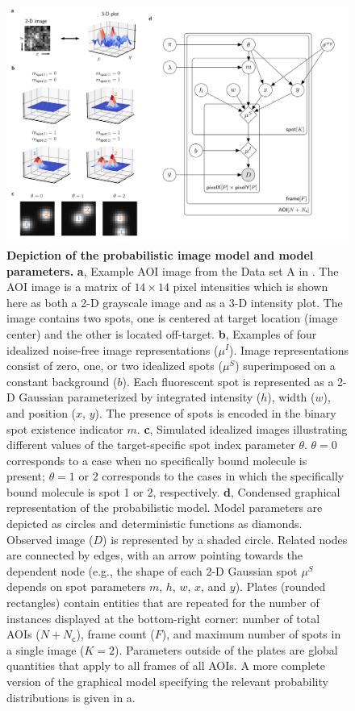 \begin{figure}
\begin{fullwidth}
\includegraphics[width=183mm]{figures/figure2.png}
\caption{\textbf{Depiction of the probabilistic image model and model parameters.} \textbf{a}, Example AOI image from the Data set A in . The AOI image is a matrix of $14 \times 14$ pixel intensities which is shown here as both a 2-D grayscale image and as a 3-D intensity plot. The image contains two spots, one is centered at target location (image center) and the other is located off-target. \textbf{b}, Examples of four idealized noise-free image representations ($\mu^I$). Image representations consist of zero, one, or two idealized spots ($\mu^S$) superimposed on a constant background ($b$). Each fluorescent spot is represented as a 2-D Gaussian parameterized by integrated intensity ($h$), width ($w$), and position ($x$, $y$). The presence of spots is encoded in the binary spot existence indicator $m$. \textbf{c}, Simulated idealized images illustrating different values of the target-specific spot index parameter $\theta$. $\theta = 0$ corresponds to a case when no specifically bound molecule is present; $\theta = 1$ or 2 corresponds to the cases in which the specifically bound molecule is spot 1 or 2, respectively. \textbf{d}, Condensed graphical representation of the probabilistic model. Model parameters are depicted as circles and deterministic functions as diamonds. Observed image ($D$) is represented by a shaded circle. Related nodes are connected by edges, with an arrow pointing towards the dependent node (e.g., the shape of each 2-D Gaussian spot $\mu^S$ depends on spot parameters $m$, $h$, $w$, $x$, and $y$). Plates (rounded rectangles) contain entities that are repeated for the number of instances displayed at the bottom-right corner: number of total AOIs ($N+N_\mathsf{c}$), frame count ($F$), and maximum number of spots in a single image ($K=2$). Parameters outside of the plates are global quantities that apply to all frames of all AOIs. A more complete version of the graphical model specifying the relevant probability distributions is given in a. }

\end{fullwidth}
\end{figure}
